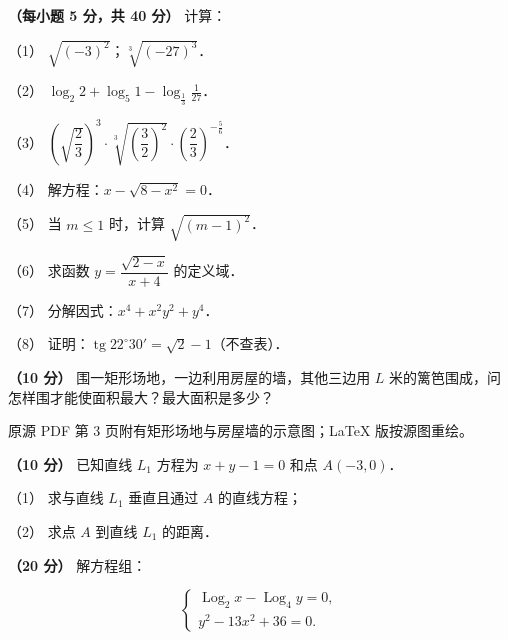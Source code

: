 \begin{question}
\textbf{（每小题 5 分，共 40 分）} 计算：

（1） $\sqrt{(-3)^2}$；$\sqrt[3]{(-27)^3}$．

（2） $\log_2 2+\log_5 1-\log_{\frac13}\frac{1}{27}$．

（3） $\left(\sqrt{\dfrac23}\right)^3\cdot\sqrt[3]{\left(\dfrac32\right)^2}\cdot\left(\dfrac23\right)^{-\frac56}$．

（4） 解方程：$x-\sqrt{8-x^2}=0$．

（5） 当 $m\leqslant 1$ 时，计算 $\sqrt{(m-1)^2}$．

（6） 求函数 $y=\dfrac{\sqrt{2-x}}{x+4}$ 的定义域．

（7） 分解因式：$x^4+x^2y^2+y^4$．

（8） 证明：$\operatorname{tg}22^\circ30'=\sqrt2-1$（不查表）．

\Needspace{0.4\textheight}
\end{question}
\begin{question}
\textbf{（10 分）} 围一矩形场地，一边利用房屋的墙，其他三边用 $L$ 米的篱笆围成，问怎样围才能使面积最大？最大面积是多少？

\begin{gktip}
原源 PDF 第 3 页附有矩形场地与房屋墙的示意图；LaTeX 版按源图重绘。
\end{gktip}
\nopagebreak[4]
\begin{center}\end{center}
\nopagebreak[4]
\end{question}
\begin{question}
\textbf{（10 分）} 已知直线 $L_1$ 方程为 $x+y-1=0$ 和点 $A(-3,0)$．

（1） 求与直线 $L_1$ 垂直且通过 $A$ 的直线方程；

（2） 求点 $A$ 到直线 $L_1$ 的距离．

\end{question}
\begin{question}
\textbf{（20 分）} 解方程组：

\nopagebreak[4]
\[
\begin{cases}
\operatorname{Log}_2 x-\operatorname{Log}_4 y=0,\\
y^2-13x^2+36=0.
\end{cases}
\]

\end{question}
